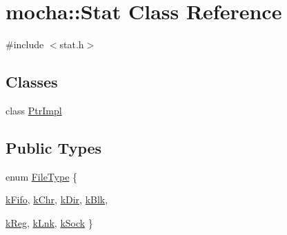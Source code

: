 \hypertarget{classmocha_1_1_stat}{
\section{mocha::Stat Class Reference}
\label{classmocha_1_1_stat}
}


{\ttfamily \#include $<$stat.h$>$}

\subsection*{Classes}
\begin{DoxyCompactItemize}
\item 
class \hyperlink{classmocha_1_1_stat_1_1_ptr_impl}{PtrImpl}
\end{DoxyCompactItemize}
\subsection*{Public Types}
\begin{DoxyCompactItemize}
\item 
enum \hyperlink{classmocha_1_1_stat_a5d24a871c13f068a042e605f575c6a0a}{FileType} \{ \par
\hyperlink{classmocha_1_1_stat_a5d24a871c13f068a042e605f575c6a0aadd7dabb38a3ac56166cbe7950a565edf}{kFifo}, 
\hyperlink{classmocha_1_1_stat_a5d24a871c13f068a042e605f575c6a0aa06f6c7345515d6f1457bf11938f095ac}{kChr}, 
\hyperlink{classmocha_1_1_stat_a5d24a871c13f068a042e605f575c6a0aadae4defc6d4084ff910e1636631598b2}{kDir}, 
\hyperlink{classmocha_1_1_stat_a5d24a871c13f068a042e605f575c6a0aa43a9adb99c91670703262d29e8851ec4}{kBlk}, 
\par
\hyperlink{classmocha_1_1_stat_a5d24a871c13f068a042e605f575c6a0aa8e9667bb63951e45fa27b5509a9e5040}{kReg}, 
\hyperlink{classmocha_1_1_stat_a5d24a871c13f068a042e605f575c6a0aa89183e1184937910edb93172de98164c}{kLnk}, 
\hyperlink{classmocha_1_1_stat_a5d24a871c13f068a042e605f575c6a0aacc4359fa24f9b2eefdd13c557a029440}{kSock}
 \}
\end{DoxyCompactItemize}
